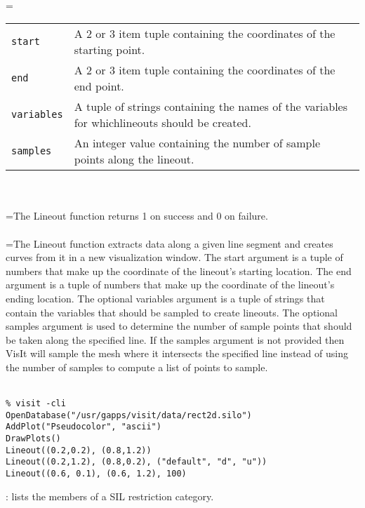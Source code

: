 \documentclass[10pt,a4paper]{report}
\begin{document}
 \\ 
\hangindent=\parindent 
\begin{tabular}{lp{9cm}}
\verb!start! & A 2 or 3 item tuple containing the coordinates of the starting point. \\
\verb!end! & A 2 or 3 item tuple containing the coordinates of the end point. \\
\verb!variables! & A tuple of strings containing the names of the variables for whichlineouts should be created. \\
\verb!samples! & An integer value containing the number of sample points along the lineout. \\
\end{tabular} \\[-2mm]


 \\ 
\hangindent=\parindent The Lineout function returns 1 on success and 0 on failure. \\[-3mm] 

 \\ 
\hangindent=\parindent The Lineout function extracts data along a given line segment and creates curves from it in a new visualization window. The start argument is a tuple of numbers that make up the coordinate of the lineout's starting location. The end argument is a tuple of numbers that make up the coordinate of the lineout's ending location. The optional variables argument is a tuple of strings that contain the variables that should be sampled to create lineouts. The optional samples argument is used to determine the number of sample points that should be taken along the specified line. If the samples argument is not provided then VisIt will sample the mesh where it intersects the specified line instead of using the number of samples to compute a list of points to sample. \\[-3mm] 

\\[-6mm]
\begin{verbatim}% visit -cli
OpenDatabase("/usr/gapps/visit/data/rect2d.silo")
AddPlot("Pseudocolor", "ascii")
DrawPlots()
Lineout((0.2,0.2), (0.8,1.2))
Lineout((0.2,1.2), (0.8,0.2), ("default", "d", "u"))
Lineout((0.6, 0.1), (0.6, 1.2), 100)
\end{verbatim}
\newpage


{}
: lists the members of a SIL restriction category.\\[-3mm]
\end{document}
